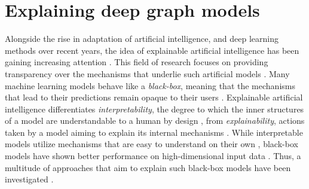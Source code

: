 \section{Explaining deep graph models}
\label{s_ExplainingGNNs}



Alongside the rise in adaptation of artificial intelligence, and deep learning methods over recent years, the idea of explainable artificial intelligence has been gaining increasing attention \cite{adadi_peeking_2018}. This field of research focuses on providing transparency over the mechanisms that underlie such artificial models \cite{barredo_arrieta_explainable_2020}. Many machine learning models behave like a \textit{black-box}, meaning that the mechanisms that lead to their predictions remain opaque to their users \cite{prado-romero_survey_2023}. Explainable artificial intelligence differentiates \textit{interpretability}, the degree to which the inner structures of a model are understandable to a human by design \cite{barredo_arrieta_explainable_2020, li_explainability_2022}, from \textit{explainability}, actions taken by a model aiming to explain its internal mechanisms \cite{barredo_arrieta_explainable_2020}. While interpretable models utilize mechanisms that are easy to understand on their own \cite{prado-romero_survey_2023}, black-box models have shown better performance on high-dimensional input data \cite{prado-romero_survey_2023}. Thus, a multitude of approaches that aim to explain such black-box models have been investigated \cite{barredo_arrieta_explainable_2020, adadi_peeking_2018}.


